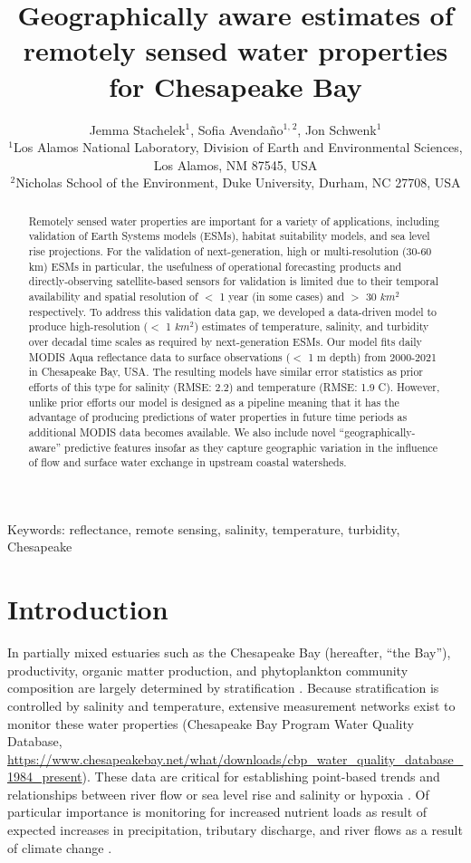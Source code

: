 \documentclass{article}
\title{Geographically aware estimates of remotely sensed water properties for Chesapeake Bay}
\author{Jemma Stachelek$^{1}$, Sofia Avendaño$^{1,}$$^{2}$, Jon Schwenk$^{1}$  \\
        \small $^{1}$Los Alamos National Laboratory, Division of Earth and Environmental Sciences, Los Alamos, NM 87545, USA \\
        \small $^{2}$Nicholas School of the Environment, Duke University, Durham, NC 27708, USA \\
}
\date{}
\begin{document}
\maketitle

\begin{abstract}
    \noindent Remotely sensed water properties are important for a variety of applications, including validation of Earth Systems models (ESMs), habitat suitability models, and sea level rise projections. For the validation of next-generation, high or multi-resolution (30-60 km) ESMs in particular, the usefulness of operational forecasting products and directly-observing satellite-based sensors for validation is limited due to their temporal availability and spatial resolution of $<$ 1 year (in some cases) and $>$ 30 $km^2$ respectively. To address this validation data gap, we developed a data-driven model to produce high-resolution ($<$ 1 $km^2$) estimates of temperature, salinity, and turbidity over decadal time scales as required by next-generation ESMs. Our model fits daily MODIS Aqua reflectance data to surface observations ($<$ 1 m depth) from 2000-2021 in Chesapeake Bay, USA. The resulting models have similar error statistics as prior efforts of this type for salinity (RMSE: 2.2) and temperature (RMSE: 1.9 C). However, unlike prior efforts our model is designed as a pipeline meaning that it has the advantage of producing predictions of water properties in future time periods as additional MODIS data becomes available. We also include novel  “geographically-aware” predictive features insofar as they capture geographic variation in the influence of flow and surface water exchange in upstream coastal watersheds.
    \end{abstract} \hspace{10pt}

Keywords: reflectance, remote sensing, salinity, temperature, turbidity, Chesapeake

\linenumbers

\section{Introduction}

In partially mixed estuaries such as the Chesapeake Bay (hereafter, “the Bay”), productivity, organic matter production, and phytoplankton community composition are largely determined by stratification \cite{xuClimateForcingSalinity2012}. Because stratification is controlled by salinity and temperature, extensive measurement networks exist to monitor these water properties (Chesapeake Bay Program Water Quality Database, \url{https://www.chesapeakebay.net/what/downloads/cbp_water_quality_database_1984_present}). These data are critical for establishing point-based trends and relationships between river flow or sea level rise and salinity or hypoxia \cite{hagyHypoxiaChesapeakeBay2004}. Of particular importance is monitoring for increased nutrient loads as result of expected increases in precipitation, tributary discharge, and river flows as a result of climate change \cite{najjarPotentialClimatechangeImpacts2010, irbyCompetingImpactsClimate2018}.
\end{document}
